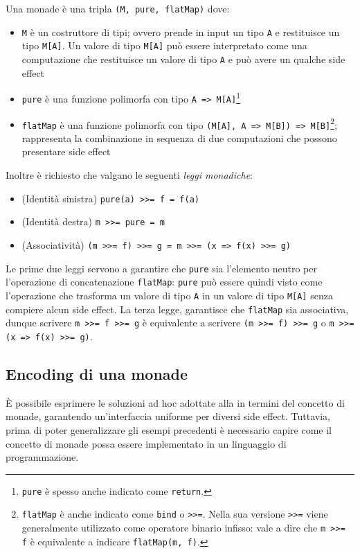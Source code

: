 Una monade è una tripla \lstinline{(M, pure, flatMap)} dove:
\begin{itemize}
  \item \lstinline{M} è un costruttore di tipi; ovvero prende in input un tipo \lstinline{A} e restituisce un tipo \lstinline{M[A]}. Un valore di tipo \lstinline{M[A]} può essere interpretato come una computazione che restituisce un valore di tipo \lstinline{A} e può avere un qualche side effect
  \item \lstinline{pure} è una funzione polimorfa con tipo \lstinline{A => M[A]}\footnote{\lstinline{pure} è spesso anche indicato come \lstinline{return}.}
  \item \lstinline{flatMap} è una funzione polimorfa con tipo \lstinline{(M[A], A => M[B]) => M[B]}\footnote{\lstinline{flatMap} è anche indicato come \lstinline{bind} o \lstinline{>>=}. Nella sua versione \lstinline{>>=} viene generalmente utilizzato come operatore binario infisso: vale a dire che \lstinline{m >>= f} è equivalente a indicare \lstinline{flatMap(m, f)}.}; rappresenta la combinazione in sequenza di due computazioni che possono presentare side effect
\end{itemize}
Inoltre è richiesto che valgano le seguenti \emph{leggi monadiche}:
\begin{itemize}
  \item (Identità sinistra) \lstinline{pure(a) >>= f = f(a)}
  \item (Identità destra) \lstinline{m >>= pure = m}
  \item (Associatività) \lstinline{(m >>= f) >>= g = m >>= (x => f(x) >>= g)}
\end{itemize}
Le prime due leggi servono a garantire che \lstinline{pure} sia l'elemento neutro per l'operazione di concatenazione \lstinline{flatMap}: \lstinline{pure} può essere quindi visto come l'operazione che trasforma un valore di tipo \lstinline{A} in un valore di tipo \lstinline{M[A]} senza compiere alcun side effect.
La terza legge, garantisce che \lstinline{flatMap} sia associativa, dunque scrivere \lstinline{m >>= f >>= g} è equivalente a scrivere \lstinline{(m >>= f) >>= g} o \lstinline{m >>= (x => f(x) >>= g)}.

\subsection{Encoding di una monade}
È possibile esprimere le soluzioni ad hoc adottate alla  in termini del concetto di monade, garantendo un'interfaccia uniforme per diversi side effect.
Tuttavia, prima di poter generalizzare gli esempi precedenti è necessario capire come il concetto di monade possa essere implementato in un linguaggio di programmazione.

